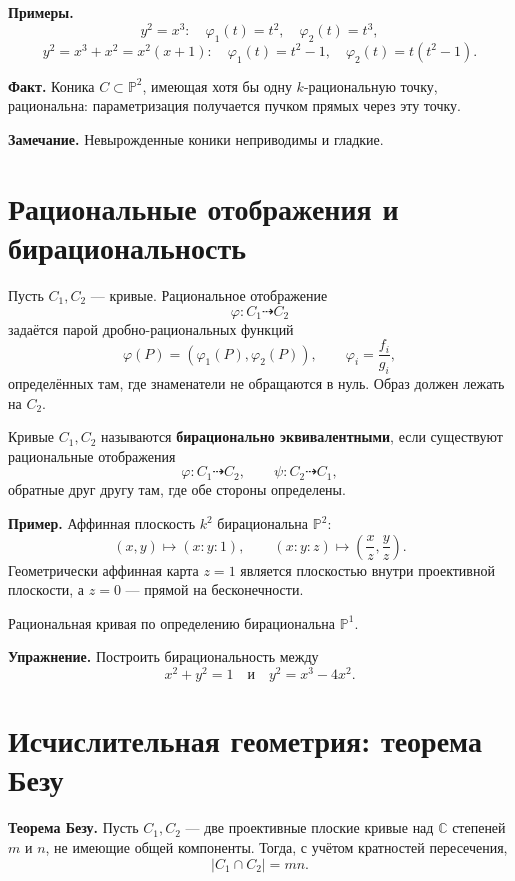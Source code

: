 \documentclass[12pt,a4paper]{article}
\newcommand{\PP}{\mathbb P}
\begin{document}
\textbf{Примеры.}
\[
y^2=x^3:\quad \varphi_1(t)=t^2,\quad\varphi_2(t)=t^3,
\]
\[
y^2=x^3+x^2=x^2(x+1):\quad \varphi_1(t)=t^2-1,\quad
\varphi_2(t)=t(t^2-1).
\]

\textbf{Факт.} Коника $C\subset\PP^2$, имеющая хотя бы одну $k$-рациональную точку, рациональна: параметризация получается пучком прямых через эту точку.

\textbf{Замечание.} Невырожденные коники неприводимы и гладкие.

\section{Рациональные отображения и бирациональность}
Пусть $C_1,C_2$ --- кривые. Рациональное отображение
\[
\varphi:C_1\dashrightarrow C_2
\]
задаётся парой дробно-рациональных функций
\[
\varphi(P)=(\varphi_1(P),\varphi_2(P)),\qquad
\varphi_i=\frac{f_i}{g_i},
\]
определённых там, где знаменатели не обращаются в нуль. Образ должен лежать на $C_2$.

Кривые $C_1,C_2$ называются \textbf{бирационально эквивалентными}, если существуют рациональные отображения
\[
\varphi:C_1\dashrightarrow C_2,\qquad \psi:C_2\dashrightarrow C_1,
\]
обратные друг другу там, где обе стороны определены.

\textbf{Пример.} Аффинная плоскость $k^2$ бирациональна $\PP^2$:
\[
(x,y)\mapsto(x:y:1),\qquad (x:y:z)\mapsto\left(\frac{x}{z},\frac{y}{z}\right).
\]
Геометрически аффинная карта $z=1$ является плоскостью внутри проективной плоскости, а $z=0$ --- прямой на бесконечности.

\begin{center}
\end{center}
Рациональная кривая по определению бирациональна $\PP^1$.

\textbf{Упражнение.} Построить бирациональность между
\[
x^2+y^2=1
\quad\text{и}\quad
y^2=x^3-4x^2.
\]

\section{Исчислительная геометрия: теорема Безу}
\textbf{Теорема Безу.} Пусть $C_1,C_2$ --- две проективные плоские кривые над $\mathbb C$ степеней $m$ и $n$, не имеющие общей компоненты. Тогда, с учётом кратностей пересечения,
\[
|C_1\cap C_2|=mn.
\]
\end{document}
